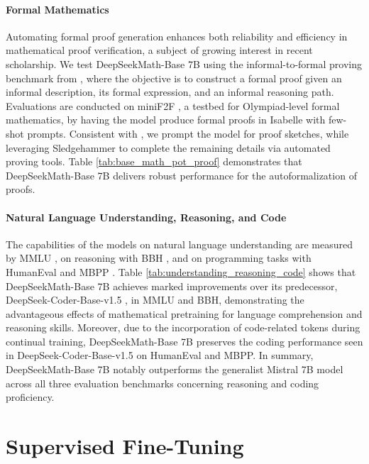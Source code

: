 \paragraph{Formal Mathematics}

Automating formal proof generation enhances both reliability and efficiency in mathematical proof verification, a subject of growing interest in recent scholarship. We test DeepSeekMath-Base 7B using the informal-to-formal proving benchmark from \citep{dsp_proof}, where the objective is to construct a formal proof given an informal description, its formal expression, and an informal reasoning path. Evaluations are conducted on miniF2F \citep{minif2f}, a testbed for Olympiad-level formal mathematics, by having the model produce formal proofs in Isabelle with few-shot prompts. Consistent with \cite{dsp_proof}, we prompt the model for proof sketches, while leveraging Sledgehammer \citep{sledgehammer} to complete the remaining details via automated proving tools. Table \ref{tab:base_math_pot_proof} demonstrates that DeepSeekMath-Base 7B delivers robust performance for the autoformalization of proofs.

\paragraph{Natural Language Understanding, Reasoning, and Code}

The capabilities of the models on natural language understanding are measured by MMLU \citep{mmlu}, on reasoning with BBH \citep{bbh}, and on programming tasks with HumanEval \citep{codex} and MBPP \citep{mbpp}. Table \ref{tab:understanding_reasoning_code} shows that DeepSeekMath-Base 7B achieves marked improvements over its predecessor, DeepSeek-Coder-Base-v1.5 \citep{deepseek-coder}, in MMLU and BBH, demonstrating the advantageous effects of mathematical pretraining for language comprehension and reasoning skills. Moreover, due to the incorporation of code-related tokens during continual training, DeepSeekMath-Base 7B preserves the coding performance seen in DeepSeek-Coder-Base-v1.5 on HumanEval and MBPP. In summary, DeepSeekMath-Base 7B notably outperforms the generalist Mistral 7B model \citep{mistral} across all three evaluation benchmarks concerning reasoning and coding proficiency.

\section{Supervised Fine-Tuning}

